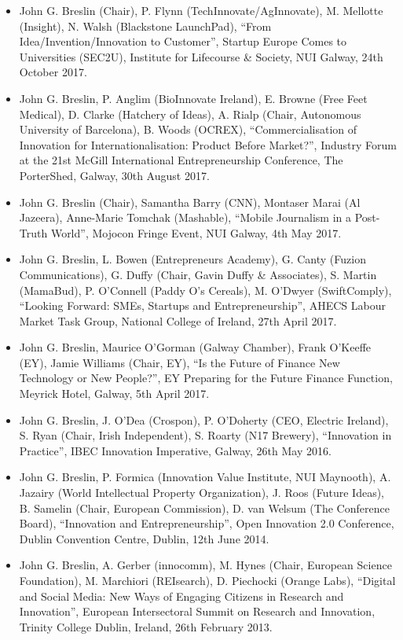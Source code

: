 \documentclass[10pt,a4paper]{res} %
\begin{document}
\begin{resume}
\begin{itemize}
\item John G. Breslin (Chair), P. Flynn (TechInnovate/AgInnovate), M. Mellotte (Insight), N. Walsh (Blackstone LaunchPad), ``From Idea/Invention/Innovation to Customer'', Startup Europe Comes to Universities (SEC2U), Institute for Lifecourse \& Society, NUI Galway, 24th October 2017.
\item John G. Breslin, P. Anglim (BioInnovate Ireland), E. Browne (Free Feet Medical), D. Clarke (Hatchery of Ideas), A. Rialp (Chair, Autonomous University of Barcelona), B. Woods (OCREX), ``Commercialisation of Innovation for Internationalisation: Product Before Market?'', Industry Forum at the 21st McGill International Entrepreneurship Conference, The PorterShed, Galway, 30th August 2017.
\item John G. Breslin (Chair), Samantha Barry (CNN), Montaser Marai (Al Jazeera), Anne-Marie Tomchak (Mashable), ``Mobile Journalism in a Post-Truth World'', Mojocon Fringe Event, NUI Galway, 4th May 2017.
\item John G. Breslin, L. Bowen (Entrepreneurs Academy), G. Canty (Fuzion Communications), G. Duffy (Chair, Gavin Duffy \& Associates), S. Martin (MamaBud), P. O'Connell (Paddy O's Cereals), M. O'Dwyer (SwiftComply), ``Looking Forward: SMEs, Startups and Entrepreneurship'', AHECS Labour Market Task Group, National College of Ireland, 27th April 2017.
\item John G. Breslin, Maurice O'Gorman (Galway Chamber), Frank O'Keeffe (EY), Jamie Williams (Chair, EY), ``Is the Future of Finance New Technology or New People?'', EY Preparing for the Future Finance Function, Meyrick Hotel, Galway, 5th April 2017.
\item John G. Breslin, J. O'Dea (Crospon), P. O'Doherty (CEO, Electric Ireland), S. Ryan (Chair, Irish Independent), S. Roarty (N17 Brewery), ``Innovation in Practice'', IBEC Innovation Imperative, Galway, 26th May 2016.
\item John G. Breslin, P. Formica (Innovation Value Institute, NUI Maynooth), A. Jazairy (World Intellectual Property Organization), J. Roos (Future Ideas), B. Samelin (Chair, European Commission), D. van Welsum (The Conference Board), ``Innovation and Entrepreneurship'', Open Innovation 2.0 Conference, Dublin Convention Centre, Dublin, 12th June 2014.
\item John G. Breslin, A. Gerber (innocomm), M. Hynes (Chair, European Science Foundation), M. Marchiori (REIsearch), D. Piechocki (Orange Labs), ``Digital and Social Media: New Ways of Engaging Citizens in Research and Innovation'', European Intersectoral Summit on Research and Innovation, Trinity College Dublin, Ireland, 26th February 2013.

\end{itemize}
\end{resume}
\end{document}
